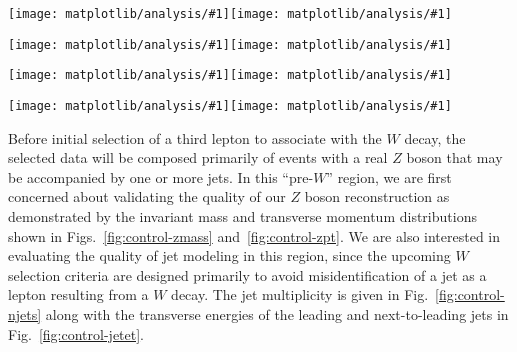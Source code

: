 {\newcommand{\myplot}[1]{\texttt{[image: matplotlib/analysis/\#1]}}

\begin{figure*}
  \centering
  \myplot{hZMass_ValidZ}\hfill\myplot{hZMass_ValidWZCand}\\
  \caption[Invariant mass distribution of reconstructed $Z$ candidates for two selections]{Invariant mass distribution for reconstructed $Z$ candidates before a $W$ candidate is selected (left) and after $W$ selection and \MET requirements are applied (right).}
  \label{fig:control-zmass}
\end{figure*}

\begin{figure*}
  \centering
  \myplot{hZpt_ValidZ}\hfill\myplot{hZpt_ValidWZCand}\\
  \caption[Transverse momentum distribution of reconstructed $Z$ candidates for two selections]{Transverse momentum distribution of selected $Z$ candidates before a $W$ candidate is selected (left) and after $W$ selection and \MET requirements are applied (right).}
  \label{fig:control-zpt}
\end{figure*}

\begin{figure*}
  \centering
  \myplot{hNJets_ValidZ}\hfill\myplot{hNJets_ValidWZCand}\\
  \caption[Jet multiplicity distribution for two selections]{Jet multiplicity distribution before a $W$ candidate is selected (left) and after $W$ selection and \MET requirements are applied (right).}
  \label{fig:control-njets}
\end{figure*}

\begin{figure*}
  \centering
  \myplot{jetPtFirst_COMB}\hfill\myplot{jetPtSecond_COMB}\\
  \caption[Transverse energy distributions of leading and next-to-leading jets]{Transverse energy distributions of leading (left) and next-to-leading (right) jets before a $W$ candidate is selected.}
  \label{fig:control-jetet}
\end{figure*}
}

Before initial selection of a third lepton to associate with the $W$ decay, the selected data will be composed primarily of events with a real $Z$ boson that may be accompanied by one or more jets.  In this ``pre-$W$'' region, we are first concerned about validating the quality of our $Z$ boson reconstruction as demonstrated by the invariant mass and transverse momentum distributions shown in Figs.~\ref{fig:control-zmass} and~\ref{fig:control-zpt}.  We are also interested in evaluating the quality of jet modeling in this region, since the upcoming $W$ selection criteria are designed primarily to avoid misidentification of a jet as a lepton resulting from a $W$ decay.  The jet multiplicity is given in Fig.~\ref{fig:control-njets} along with the transverse energies of the leading and next-to-leading jets in Fig.~\ref{fig:control-jetet}.

